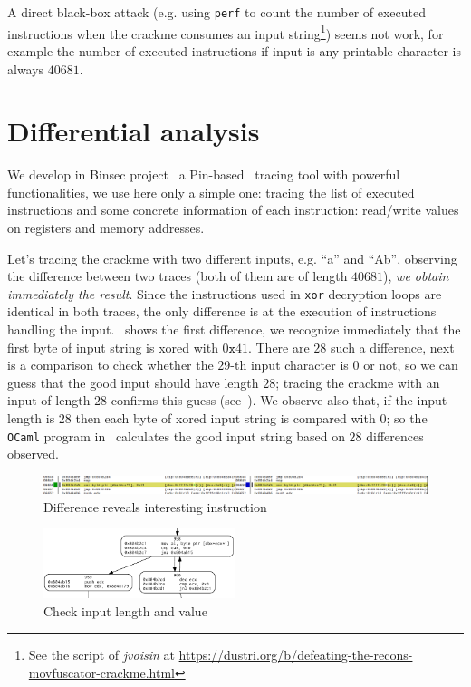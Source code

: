 \documentclass{easychair}
\begin{document}
A direct black-box attack (e.g. using \texttt{perf} to count the number of executed instructions when the crackme consumes an input string\footnote{See the script of \emph{jvoisin} at \url{https://dustri.org/b/defeating-the-recons-movfuscator-crackme.html}}) seems not work, for example the number of executed instructions if input is any printable character is always $40681$.

\section{Differential analysis}
We develop in Binsec project~\autocite{binsec} a Pin-based~\autocite{LukCMPKLWRH05} tracing tool with powerful functionalities, we use here only a simple one: tracing the list of executed instructions and some concrete information of each instruction: read/write values on registers and memory addresses.

Let's tracing the crackme with two different inputs, e.g. ``a'' and ``Ab'', observing the difference between two traces (both of them are of length $40681$),  \emph{we obtain immediately the result}. Since the instructions used in \texttt{xor} decryption loops are identical in both traces, the only difference is at the execution of instructions handling the input.~ shows the first difference, we recognize immediately that the first byte of input string is xored with $0\mathtt{x}41$. There are $28$ such a difference, next is a comparison to check whether the $29$-th input character is $0$ or not, so we can guess that the good input should have length $28$; tracing the crackme with an input of length $28$ confirms this guess (see~). We observe also that, if the input length is $28$ then each byte of xored input string is compared with $0$; so the \texttt{OCaml} program in~ calculates the good input string based on $28$ differences observed.

\begin{figure}[ht]
  \centering
  \includegraphics[width=1.0\textwidth,keepaspectratio]{compare_first.png}
  \caption{Difference reveals interesting instruction}
  \label{fig:firstdiff}
\end{figure}

\begin{figure}[ht]
  \centering
  \includegraphics[width=0.5\textwidth,keepaspectratio]{check_input.png}
  \caption{Check input length and value}
  \label{fig:checkinput}
\end{figure}
\end{document}
